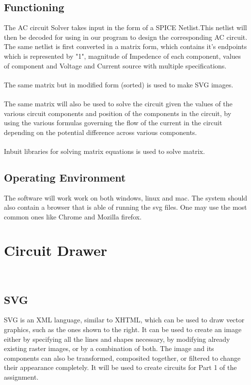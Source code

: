 \documentclass{scrreprt}
\begin{document}
\section{Functioning}
$ $\\
The AC circuit Solver takes input in the form of a SPICE Netlist.This netlist will then be decoded for using in our program to design the corresponding AC circuit. The same netlist is first converted in a matrix form, which contains it's endpoints which is represented by "1",  magnitude of Impedence of each component, values of component and Voltage and Current source with multiple specifications. \\
\\
 The same matrix but in modified form (sorted) is used to make SVG images. \\
 \\
  The same matrix will also be used to solve the circuit given the values of the various circuit components and position of the components in the circuit, by using the various formulas governing the flow of the current in the circuit depending on the potential difference across various components.\\
  \\
  Inbuit libraries for solving matrix equations is used to solve matrix.
  \\
  $ $

\section{Operating Environment}

$ $
\\
The software will work work on both windows, linux and mac. The system should also contain a browser that is able of running the svg files. One may use the most common ones like Chrome and Mozilla firefox.\\
$ $

\chapter{Circuit Drawer}
$ $
\\
\\
$ $

\section{SVG}
$ $\\
SVG is an XML language, similar to XHTML, which can be used to draw vector graphics, such as the ones shown to the right. It can be used to create an image either by specifying all the lines and shapes necessary, by modifying already existing raster images, or by a combination of both. The image and its components can also be transformed, composited together, or filtered to change their appearance completely. It will be used to create circuits for Part 1 of the assignment.
\\
$ $
\end{document}
